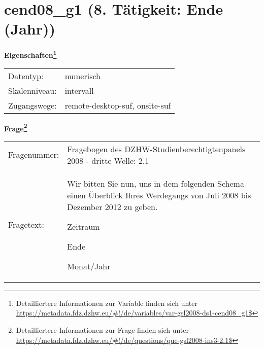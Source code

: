 
    \setcounter{footnote}{0}

    \vspace*{-1.8cm}
	\section{cend08\_g1 (8. Tätigkeit: Ende (Jahr))}
	\label{section:cend08_g1}



    \vspace*{0.5cm}
    \noindent\textbf{Eigenschaften\footnote{Detailliertere Informationen zur Variable finden sich unter
		\url{https://metadata.fdz.dzhw.eu/\#!/de/variables/var-gsl2008-ds1-cend08_g1$}}}\\
	\begin{tabularx}{\hsize}{@{}lX}
	Datentyp: & numerisch \\
	Skalenniveau: & intervall \\
	Zugangswege: &
	  remote-desktop-suf, 
	  onsite-suf
 \\
    \end{tabularx}



				\vspace*{0.5cm}
                \noindent\textbf{Frage\footnote{Detailliertere Informationen zur Frage finden sich unter
		              \url{https://metadata.fdz.dzhw.eu/\#!/de/questions/que-gsl2008-ins3-2.1$}}}\\
				\begin{tabularx}{\hsize}{@{}lX}
					Fragenummer: &
					  Fragebogen des DZHW-Studienberechtigtenpanels 2008 - dritte Welle:
					  2.1
 \\
					Fragetext: & Wir bitten Sie nun, uns in dem folgenden Schema einen Überblick Ihres Werdegangs von Juli 2008 bis Dezember 2012 zu geben.\par  Zeitraum\par  Ende\par  Monat/Jahr \\
				\end{tabularx}






